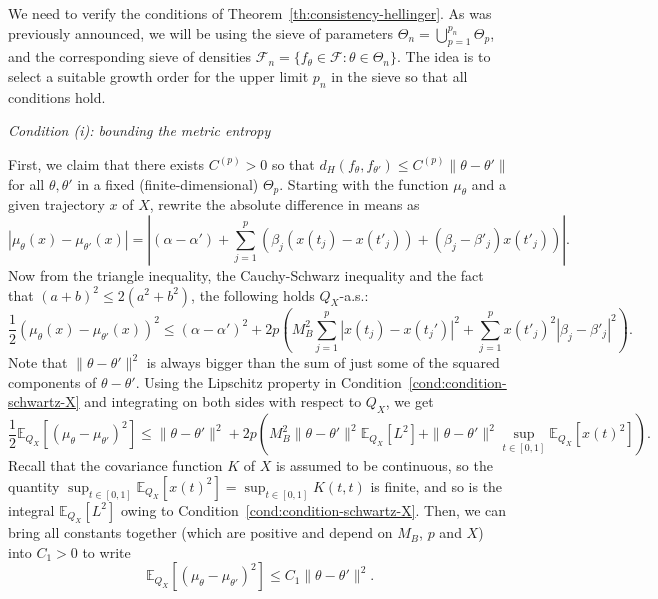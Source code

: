 We need to verify the conditions of Theorem~\ref{th:consistency-hellinger}. As was previously announced, we will be using the sieve of parameters \(\Theta_n = \bigcup_{p=1}^{p_n} \Theta_p\), and the corresponding sieve of densities \(\mathcal F_n=\{f_\theta\in \mathcal F: \theta \in \Theta_n\}\). The idea is to select a suitable growth order for the upper limit \(p_n\) in the sieve so that all conditions hold.

\noindent\textit{Condition (i): bounding the metric entropy}

\noindent First, we claim that there exists \(C^{(p)}>0\) so that \(d_H(f_\theta, f_{\theta'})\leq C^{(p)}\|\theta - \theta'\|\) for all \(\theta, \theta'\) in a fixed (finite-dimensional) \(\Theta_p\). Starting with the function \(\mu_\theta\) and a given trajectory \(x\) of \(X\), rewrite the absolute difference in means as
\[
  |\mu_\theta(x) - \mu_{\theta'}(x)| = \left| (\alpha - \alpha') + \sum_{j=1}^p \left(\beta_j (x(t_j) - x(t'_{j}))+ (\beta_j - \beta'_{j})x(t'_{j})\right) \right|.
\]
Now from the triangle inequality, the Cauchy-Schwarz inequality and the fact that \((a+b)^2 \leq 2(a^2 + b^2)\), the following holds \(Q_X\)-a.s.:
\[
  \frac{1}{2}(\mu_\theta(x) - \mu_{\theta'}(x))^2 \leq (\alpha - \alpha')^2 + 2p\left(M_B^2\sum_{j=1}^p |x(t_j) - x(t_j')|^2 + \sum_{j=1}^p x(t'_j)^2|\beta_j - \beta'_j|^2\right).
\]
Note that \(\|\theta-\theta'\|^2\) is always bigger than the sum of just some of the squared components of \(\theta - \theta'\). Using the Lipschitz property in Condition~\ref{cond:condition-schwartz-X} and integrating on both sides with respect to \(Q_X\), we get
\[
  \frac{1}{2}\mathbb E_{Q_X}\left[(\mu_\theta - \mu_{\theta'})^2\right] \leq \|\theta - \theta'\|^2 + 2p\left(M_B^2 \|\theta - \theta'\|^2 \mathbb{E}_{Q_X}[L^2] + \|\theta - \theta'\|^2 \sup_{t\in[0,1]} \mathbb{E}_{Q_X}[x(t)^2] \right).
\]
Recall that the covariance function \(K\) of \(X\) is assumed to be continuous, so the quantity \(\sup_{t\in[0,1]} \mathbb{E}_{Q_X}[x(t)^2]=\sup_{t\in[0,1]}K(t,t)\) is finite, and so is the integral \(\mathbb{E}_{Q_X}[L^2]\) owing to Condition~\ref{cond:condition-schwartz-X}. Then, we can bring all constants together (which are positive and depend on \(M_B\), \(p\) and \(X\)) into \(C_1>0\) to write
\begin{equation}\label{eq:th9-bound1}
  \mathbb{E}_{Q_X}\left[(\mu_\theta - \mu_{\theta'})^2\right] \leq C_1 \|\theta - \theta'\|^2.
\end{equation}

